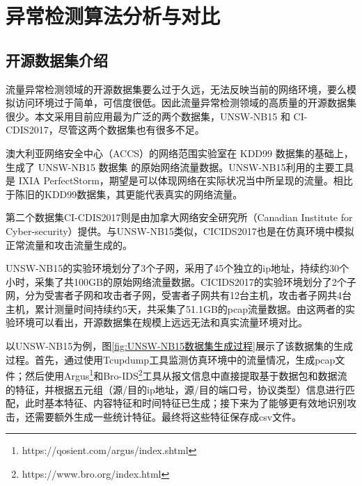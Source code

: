 
\chapter{异常检测算法分析与对比}
\section{开源数据集介绍}
流量异常检测领域的开源数据集要么过于久远，无法反映当前的网络环境，要么模拟访问环境过于简单，可信度很低。因此流量异常检测领域的高质量的开源数据集很少。本文采用目前应用最为广泛的两个数据集，UNSW-NB15 和 CI-
CDIS2017，尽管这两个数据集也有很多不足。

澳大利亚网络安全中心（ACCS）的网络范围实验室在 KDD99 数据集的基础上，生成了 UNSW-NB15 数据集\cite{moustafa2015unsw} 的原始网络流量数据。UNSW-NB15利用的主要工具是 IXIA PerfectStorm，期望是可以体现网络在实际状况当中所呈现的流量。相比于陈旧的KDD99数据集\cite{ozgur2016review}，其更能代表真实的网络流量。

第二个数据集CI-CDIS2017则是由加拿大网络安全研究所（Canadian Institute for Cyber-security）提供。与UNSW-NB15类似，CICIDS2017也是在仿真环境中模拟正常流量和攻击流量生成的。

UNSW-NB15的实验环境划分了3个子网，采用了45个独立的ip地址，持续约30个小时，采集了共100GB的原始网络流量数据。CICIDS2017的实验环境划分了2个子网，分为受害者子网和攻击者子网，受害者子网共有12台主机，攻击者子网共4台主机，累计测量时间持续约5天，共采集了51.1GB的pcap流量数据。由这两者的实验环境可以看出，开源数据集在规模上远远无法和真实流量环境对比。




以UNSW-NB15为例，图\ref{fig:UNSW-NB15数据集生成过程}展示了该数据集的生成过程。首先，通过使用Tcupdump工具监测仿真环境中的流量情况，生成pcap文件；然后使用Argus\footnote{https://qosient.com/argus/index.shtml}和Bro-IDS\footnote{https://www.bro.org/index.html}工具从报文信息中直接提取基于数据包和数据流的特征，并根据五元组（源/目的ip地址，源/目的端口号，协议类型）信息进行匹配，此时基本特征、内容特征和时间特征已生成；接下来为了能够更有效地识别攻击，还需要额外生成一些统计特征。最终将这些特征保存成csv文件。



